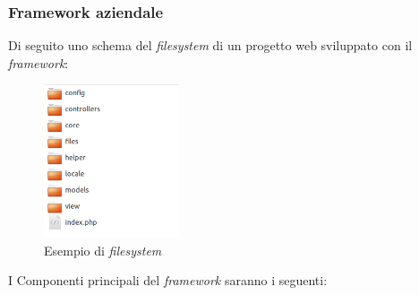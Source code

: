 \subsubsection{Framework aziendale}
    Di seguito uno schema del \textit{filesystem} di un progetto web sviluppato con il \textit{framework}:
    \begin{figure}[!h] 
        \centering 
        \includegraphics[width=4cm]{immagini/f12doc/a.png}
        \caption{Esempio di \textit{filesystem}}
    \end{figure}
    I Componenti principali del \textit{framework} saranno i seguenti:
